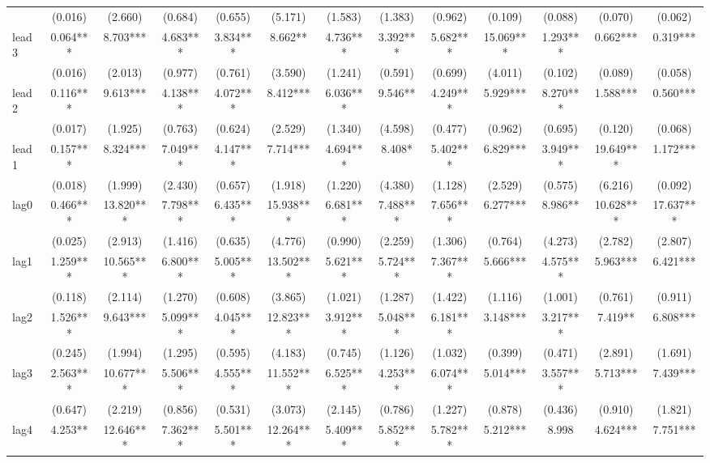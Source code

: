 \begin{tabular}{lcccccccccccc}
 & (0.016) & (2.660) & (0.684) & (0.655) & (5.171) & (1.583) & (1.383) & (0.962) & (0.109) & (0.088) & (0.070) & (0.062) \\
lead3 & 0.064*** & 8.703*** & 4.683*** & 3.834*** & 8.662** & 4.736*** & 3.392*** & 5.682*** & 15.069*** & 1.293*** & 0.662*** & 0.319*** \\
 & (0.016) & (2.013) & (0.977) & (0.761) & (3.590) & (1.241) & (0.591) & (0.699) & (4.011) & (0.102) & (0.089) & (0.058) \\
lead2 & 0.116*** & 9.613*** & 4.138*** & 4.072*** & 8.412*** & 6.036*** & 9.546** & 4.249*** & 5.929*** & 8.270*** & 1.588*** & 0.560*** \\
 & (0.017) & (1.925) & (0.763) & (0.624) & (2.529) & (1.340) & (4.598) & (0.477) & (0.962) & (0.695) & (0.120) & (0.068) \\
lead1 & 0.157*** & 8.324*** & 7.049*** & 4.147*** & 7.714*** & 4.694*** & 8.408* & 5.402*** & 6.829*** & 3.949*** & 19.649*** & 1.172*** \\
 & (0.018) & (1.999) & (2.430) & (0.657) & (1.918) & (1.220) & (4.380) & (1.128) & (2.529) & (0.575) & (6.216) & (0.092) \\
lag0 & 0.466*** & 13.820*** & 7.798*** & 6.435*** & 15.938*** & 6.681*** & 7.488*** & 7.656*** & 6.277*** & 8.986** & 10.628*** & 17.637*** \\
 & (0.025) & (2.913) & (1.416) & (0.635) & (4.776) & (0.990) & (2.259) & (1.306) & (0.764) & (4.273) & (2.782) & (2.807) \\
lag1 & 1.259*** & 10.565*** & 6.800*** & 5.005*** & 13.502*** & 5.621*** & 5.724*** & 7.367*** & 5.666*** & 4.575*** & 5.963*** & 6.421*** \\
 & (0.118) & (2.114) & (1.270) & (0.608) & (3.865) & (1.021) & (1.287) & (1.422) & (1.116) & (1.001) & (0.761) & (0.911) \\
lag2 & 1.526*** & 9.643*** & 5.099*** & 4.045*** & 12.823*** & 3.912*** & 5.048*** & 6.181*** & 3.148*** & 3.217*** & 7.419** & 6.808*** \\
 & (0.245) & (1.994) & (1.295) & (0.595) & (4.183) & (0.745) & (1.126) & (1.032) & (0.399) & (0.471) & (2.891) & (1.691) \\
lag3 & 2.563*** & 10.677*** & 5.506*** & 4.555*** & 11.552*** & 6.525*** & 4.253*** & 6.074*** & 5.014*** & 3.557*** & 5.713*** & 7.439*** \\
 & (0.647) & (2.219) & (0.856) & (0.531) & (3.073) & (2.145) & (0.786) & (1.227) & (0.878) & (0.436) & (0.910) & (1.821) \\
lag4 & 4.253** & 12.646*** & 7.362*** & 5.501*** & 12.264*** & 5.409*** & 5.852*** & 5.782*** & 5.212*** & 8.998 & 4.624*** & 7.751*** \\

\end{tabular}
